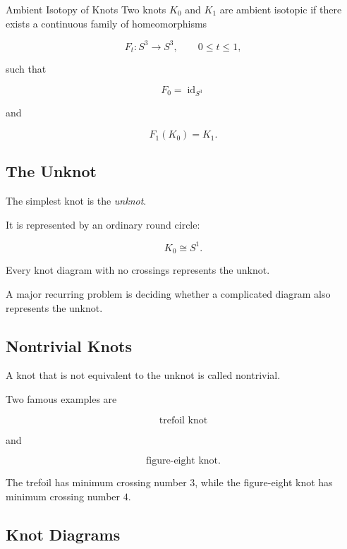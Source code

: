 \begin{definitionbox}{Ambient Isotopy of Knots}
Two knots \(K_0\) and \(K_1\) are ambient isotopic if there exists a
continuous family of homeomorphisms

\[
\boxed{
F_t:S^3\to S^3,
\qquad
0\leq t\leq1,
}
\]

such that

\[
F_0=\operatorname{id}_{S^3}
\]

and

\[
\boxed{
F_1(K_0)=K_1.
}
\]
\end{definitionbox}

\subsection{The Unknot}
\label{subsec:unknot}

The simplest knot is the \emph{unknot}.

It is represented by an ordinary round circle:

\[
\boxed{
K_0\cong S^1.
}
\]

Every knot diagram with no crossings represents the unknot.

A major recurring problem is deciding whether a complicated diagram also
represents the unknot.

\subsection{Nontrivial Knots}
\label{subsec:nontrivial-knots}

A knot that is not equivalent to the unknot is called nontrivial.

Two famous examples are

\[
\boxed{
\text{trefoil knot}
}
\]

and

\[
\boxed{
\text{figure-eight knot}.
}
\]

The trefoil has minimum crossing number \(3\), while the figure-eight knot
has minimum crossing number \(4\).

\subsection{Knot Diagrams}
\label{subsec:knot-diagrams}

